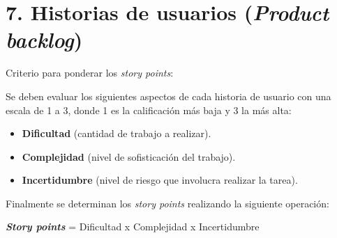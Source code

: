 \documentclass[
11pt, %
codirector, %
]{charter}
\begin{document}
\begin{enumerate}
\end{enumerate}

\section{7. Historias de usuarios (\textit{Product backlog})}
\label{sec:backlog}

Criterio para ponderar los \textit{story points}: 

Se deben evaluar los siguientes aspectos de cada historia de usuario con una escala de 1 a 3, donde 1 es la calificación más baja y 3 la más alta:
\begin{itemize}
	\item \textbf{Dificultad} (cantidad de trabajo a realizar).
	\item \textbf{Complejidad} (nivel de sofisticación del trabajo).
	\item \textbf{Incertidumbre} (nivel de riesgo que involucra realizar la tarea).
\end{itemize}	

Finalmente se determinan los \textit{story points} realizando la siguiente operación:

\textbf{\textit{Story points}} = Dificultad x Complejidad x Incertidumbre
\end{document}
